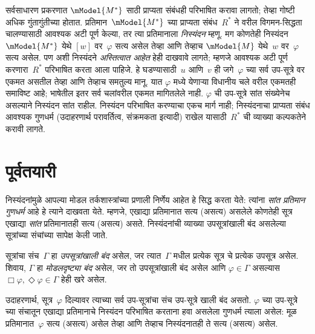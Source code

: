 सर्वसाधारण प्रकरणात
$\mModel{M^*}$ साठी
प्राप्यता संबंधही परिभाषित
करावा लागतो; तेव्हा
गोष्टी अधिक गुंतागुंतीच्या
होतात. प्रतिमान~$\mModel{M^*}$
च्या प्राप्यता संबंध~$R^*$
ने वरील विगमन-सिद्धता
चालण्यासाठी आवश्यक अटी
पूर्ण केल्या, तर त्या
प्रतिमानाला
\emph{निस्यंदन} म्हणू.
मग कोणतेही निस्यंदन~$\mModel{M^*}$
येथे $[w]$ वर~$\varphi$ सत्य
असेल तेव्हा आणि तेव्हाच
$\mModel{M}$ येथे~$w$
वर~$\varphi$ सत्य असेल.
पण अशी निस्यंदने
\emph{अस्तित्वात आहेत}
हेही दाखवावे लागते;
म्हणजे आवश्यक अटी
पूर्ण करणारा~$R^*$
परिभाषित करता आला पाहिजे.
हे घडण्यासाठी~$u$ आणि~$v$
ही जगे~$\varphi$ च्या सर्व उप-सूत्रे वर
एकमत असतील तेव्हा आणि तेव्हाच समतुल्य मानू.
यात $\varphi$ मध्ये येणाऱ्या विधानीय चले वरील
एकमतही समाविष्ट आहे; भाषेतील इतर सर्व चलांवरील एकमत मागितलेले नाही.
$\varphi$ ची उप-सूत्रे
सांत संख्येनेच असल्याने
निस्यंदन सांत राहील.
निस्यंदन परिभाषित
करण्याचा एकच मार्ग नाही;
निस्यंदनाचा प्राप्यता संबंध
आवश्यक गुणधर्म
(उदाहरणार्थ परावर्तित्व,
संक्रमकता इत्यादी)
राखेल यासाठी~$R^*$
ची व्याख्या कल्पकतेने
करावी लागते.













\section{पूर्वतयारी}\label{nml:fil:pre:sec}

निस्यंदनांमुळे आपल्या मोडल तर्कशास्त्रांच्या
प्रणाली निर्णेय आहेत हे सिद्ध करता येते:
त्यांना \emph{सांत प्रतिमान गुणधर्म}
आहे हे त्याने दाखवता येते. म्हणजे,
एखाद्या प्रतिमानात सत्य (असत्य)
असलेले कोणतेही सूत्र
एखाद्या \emph{सांत} प्रतिमानातही
सत्य (असत्य) असते. निस्यंदनांची
व्याख्या उपसूत्रांखाली बंद असलेल्या
सूत्रांच्या संचांच्या
सापेक्ष केली जाते.

\begin{defn}\label{nml:fil:pre:defn:modallyclosed}
  सूत्रांचा संच~$\Gamma$
  हा \emph{उपसूत्रांखाली बंद}
  असेल, जर त्यात~$\Gamma$
  मधील प्रत्येक सूत्र
  चे प्रत्येक उपसूत्र असेल.
  शिवाय, $\Gamma$ हा
  \emph{मोडलदृष्ट्या बंद}
  असेल, जर तो उपसूत्रांखाली
  बंद असेल आणि
  $\varphi \in \Gamma$ असल्यास
  $\Box\varphi,
  \Diamond\varphi \in \Gamma$
  हेही खरे असेल.
\end{defn}

उदाहरणार्थ, सूत्र~$\varphi$
दिल्यावर त्याच्या सर्व
उप-सूत्रांचा संच
उप-सूत्रे खाली बंद
असतो. $\varphi$ च्या उप-सूत्रे
च्या संचातून एखाद्या प्रतिमानाचे
निस्यंदन परिभाषित करताना
हवा असलेला गुणधर्म त्याला
असेल: मूळ प्रतिमानात~$\varphi$
सत्य (असत्य) असेल तेव्हा
आणि तेव्हाच निस्यंदनातही
ते सत्य (असत्य) असेल.

